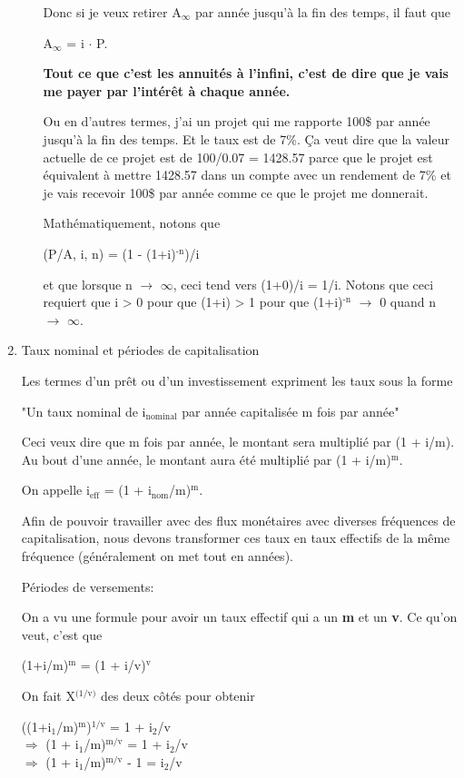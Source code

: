 \documentclass[11pt]{article}
\begin{document}
\begin{enumerate}
\begin{enumerate}
Donc si je veux retirer A\(_{\infty}\) par année jusqu'à la fin des temps, il faut que

A\(_{\infty}\) = i \(\cdot\) P.

\textbf{Tout ce que c'est les annuités à l'infini, c'est de dire que je vais me payer
par l'intérêt à chaque année.}

Ou en d'autres termes, j'ai un projet qui me rapporte 100\$ par année jusqu'à la
fin des temps.  Et le taux est de 7\%.  Ça veut dire que la valeur actuelle de ce
projet est de 100/0.07 = 1428.57 parce que le projet est équivalent à mettre
1428.57 dans un compte avec un rendement de 7\% et je vais recevoir 100\$ par
année comme ce que le projet me donnerait.

Mathématiquement, notons que

(P/A, i, n) = (1 - (1+i)\(^{\text{-n}}\))/i

et que lorsque n \(\to\) \(\infty\), ceci tend vers (1+0)/i = 1/i. Notons que ceci requiert que
i > 0 pour que (1+i) > 1 pour que (1+i)\(^{\text{-n}}\) \(\to\) 0 quand n \(\to\) \(\infty\).
\end{enumerate}

\item Taux nominal et périodes de capitalisation
\label{sec:org203e86f}

Les termes d'un prêt ou d'un investissement expriment les taux sous la forme

"Un taux nominal de i\(_{\text{nominal}}\) par année capitalisée m fois par année"

Ceci veux dire que m fois par année, le montant sera multiplié par (1 + i/m).
Au bout d'une année, le montant aura été multiplié par (1 + i/m)\(^{\text{m}}\).

On appelle i\(_{\text{eff}}\) = (1 + i\(_{\text{nom}}\)/m)\(^{\text{m}}\).

Afin de pouvoir travailler avec des flux monétaires avec diverses fréquences de
capitalisation, nous devons transformer ces taux en taux effectifs de la même
fréquence (généralement on met tout en années).

Périodes de versements:

On a vu une formule pour avoir un taux effectif qui a un \textbf{m} et un \textbf{v}.  Ce
qu'on veut, c'est que

(1+i/m)\(^{\text{m}}\) = (1 + i/v)\(^{\text{v}}\)

On fait X\(^{\text{(1/v)}}\) des deux côtés pour obtenir

((1+i\(_{\text{1}}\)/m)\(^{\text{m}}\))\(^{\text{1/v}}\) = 1 + i\(_{\text{2}}\)/v \\
\(\Rightarrow\) (1 + i\(_{\text{1}}\)/m)\(^{\text{m/v}}\) = 1 + i\(_{\text{2}}\)/v \\
\(\Rightarrow\) (1 + i\(_{\text{1}}\)/m)\(^{\text{m/v}}\) - 1 = i\(_{\text{2}}\)/v \\


\end{enumerate}
\end{document}
